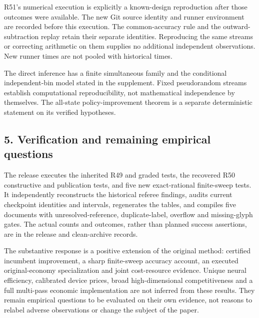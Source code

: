 R51's numerical execution is explicitly a known-design reproduction
after those outcomes were available. The new Git source identity and
runner environment are recorded before this execution. The
common-accuracy rule and the outward-subtraction replay retain their
separate identities. Reproducing the same streams or correcting
arithmetic on them supplies no additional independent observations. New
runner times are not pooled with historical times.

The direct inference has a finite simultaneous family and the
conditional independent-bin model stated in the supplement. Fixed
pseudorandom streams establish computational reproducibility, not
mathematical independence by themselves. The all-state
policy-improvement theorem is a separate deterministic statement on its
verified hypotheses.

\hypertarget{verification-and-remaining-empirical-questions}{%
\subsection{5. Verification and remaining empirical
questions}\label{verification-and-remaining-empirical-questions}}

The release executes the inherited R49 and graded tests, the recovered
R50 constructive and publication tests, and five new exact-rational
finite-sweep tests. It independently reconstructs the historical referee
findings, audits current checkpoint identities and intervals,
regenerates the tables, and compiles five documents with
unresolved-reference, duplicate-label, overflow and missing-glyph gates.
The actual counts and outcomes, rather than planned success assertions,
are in the release and clean-archive records.

The substantive response is a positive extension of the original method:
certified incumbent improvement, a sharp finite-sweep accuracy account,
an executed original-economy specialization and joint cost-resource
evidence. Unique neural efficiency, calibrated device prices, broad
high-dimensional competitiveness and a full multi-pass economic
implementation are not inferred from these results. They remain
empirical questions to be evaluated on their own evidence, not reasons
to relabel adverse observations or change the subject of the paper.
